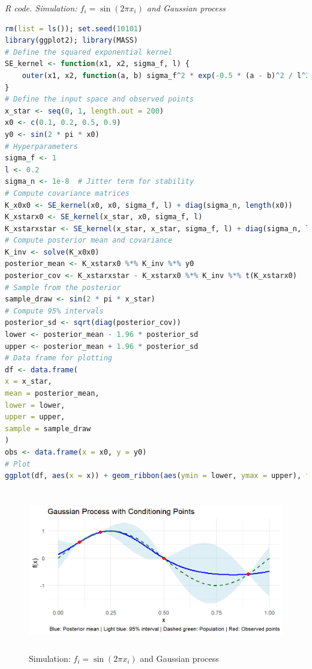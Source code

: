 \begin{tcolorbox}[enhanced,width=4.67in,center upper,
	fontupper=\large\bfseries,drop shadow southwest,sharp corners]
	\textit{R code. Simulation: $f_i=\sin(2\pi x_i)$ and Gaussian process}
	\begin{VF}
		\begin{lstlisting}[language=R]
rm(list = ls()); set.seed(10101)
library(ggplot2); library(MASS)
# Define the squared exponential kernel
SE_kernel <- function(x1, x2, sigma_f, l) {
	outer(x1, x2, function(a, b) sigma_f^2 * exp(-0.5 * (a - b)^2 / l^2))
}
# Define the input space and observed points
x_star <- seq(0, 1, length.out = 200)
x0 <- c(0.1, 0.2, 0.5, 0.9)
y0 <- sin(2 * pi * x0)
# Hyperparameters
sigma_f <- 1
l <- 0.2
sigma_n <- 1e-8  # Jitter term for stability
# Compute covariance matrices
K_x0x0 <- SE_kernel(x0, x0, sigma_f, l) + diag(sigma_n, length(x0))
K_xstarx0 <- SE_kernel(x_star, x0, sigma_f, l)
K_xstarxstar <- SE_kernel(x_star, x_star, sigma_f, l) + diag(sigma_n, length(x_star))
# Compute posterior mean and covariance
K_inv <- solve(K_x0x0)
posterior_mean <- K_xstarx0 %*% K_inv %*% y0
posterior_cov <- K_xstarxstar - K_xstarx0 %*% K_inv %*% t(K_xstarx0)
# Sample from the posterior
sample_draw <- sin(2 * pi * x_star) 
# Compute 95% intervals
posterior_sd <- sqrt(diag(posterior_cov))
lower <- posterior_mean - 1.96 * posterior_sd
upper <- posterior_mean + 1.96 * posterior_sd
# Data frame for plotting
df <- data.frame(
x = x_star,
mean = posterior_mean,
lower = lower,
upper = upper,
sample = sample_draw
)
obs <- data.frame(x = x0, y = y0)
# Plot
ggplot(df, aes(x = x)) + geom_ribbon(aes(ymin = lower, ymax = upper), fill = "lightblue", alpha = 0.4) + geom_line(aes(y = mean), color = "blue", linewidth = 1.2) + geom_line(aes(y = sample), color = "darkgreen", linewidth = 1, linetype = "dashed") + geom_point(data = obs, aes(x = x, y = y), color = "red", size = 3) + labs( title = "Gaussian Process with Conditioning Points", x = "x", y = "f(x)", caption = "Blue: Posterior mean | Light blue: 95% interval | Dashed green: Population | Red: Observed points" ) + theme_minimal(base_size = 14)
\end{lstlisting}
	\end{VF}
\end{tcolorbox}

\begin{figure}[!h]
	\centering
	\includegraphics[width=340pt, height=200pt]{Chapters/chapter13/figures/GPsimPoints.png}
	\caption{Simulation: $f_i=\sin(2\pi x_i)$ and Gaussian process}
	\label{GPsimPoints}
\end{figure} 

